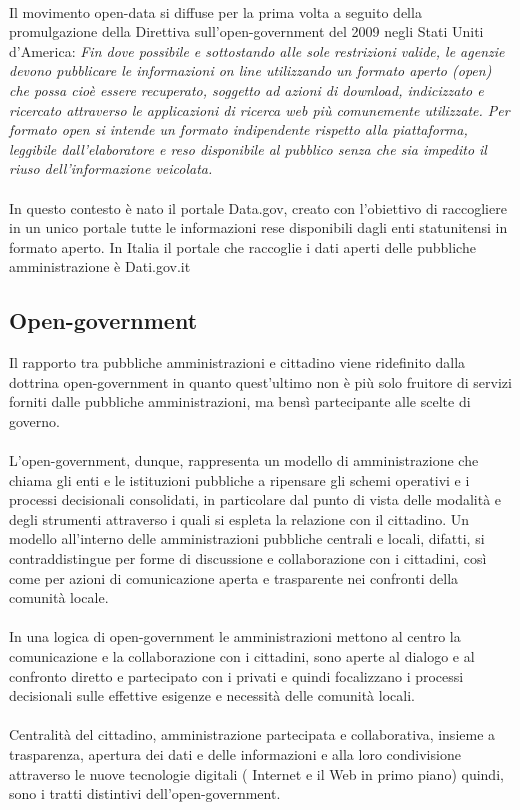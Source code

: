 \documentclass{article}
\theoremstyle{plain}
\theoremstyle{definition}
\begin{document}
\phantom
\\
Il movimento open-data si diffuse per la prima volta a seguito della promulgazione della Direttiva sull'open-government del 2009 negli Stati Uniti d'America:
\textit{Fin dove possibile e sottostando alle sole restrizioni valide, le agenzie devono pubblicare le informazioni on line utilizzando un formato aperto (open) che possa cioè essere recuperato, soggetto ad azioni di download, indicizzato e ricercato attraverso le applicazioni di ricerca web più comunemente utilizzate. Per formato open si intende un formato indipendente rispetto alla piattaforma, leggibile dall'elaboratore e reso disponibile al pubblico senza che sia impedito il riuso dell'informazione veicolata.}
\\
\\
In questo contesto è nato il portale Data.gov, creato con l'obiettivo di raccogliere in un unico portale tutte le informazioni rese disponibili dagli enti statunitensi in formato aperto. In Italia il portale che raccoglie i dati aperti delle pubbliche amministrazione è Dati.gov.it

\subsection{Open-government} 
Il rapporto tra pubbliche amministrazioni e cittadino viene ridefinito dalla dottrina open-government in quanto quest'ultimo non è più solo fruitore di servizi forniti dalle pubbliche amministrazioni, ma bensì partecipante alle scelte di governo.
\\
\\
L'open-government, dunque, rappresenta un modello di amministrazione che chiama gli enti e le istituzioni pubbliche a ripensare gli schemi operativi e i processi decisionali consolidati, in particolare dal punto di vista delle modalità e degli strumenti attraverso i quali si espleta la relazione con il cittadino. Un modello  all'interno delle amministrazioni pubbliche centrali e locali, difatti, si contraddistingue per forme di discussione e collaborazione con i cittadini, così come per azioni di comunicazione aperta e trasparente nei confronti della comunità locale. 
\\
\\
In una logica di open-government le amministrazioni mettono al centro la comunicazione e la collaborazione con i cittadini, sono aperte al dialogo e al confronto diretto e partecipato con i privati e quindi focalizzano i processi decisionali sulle effettive esigenze e necessità delle comunità locali. 
\\
\\
Centralità del cittadino, amministrazione partecipata e collaborativa, insieme a trasparenza, apertura dei dati e delle informazioni e alla loro condivisione attraverso le nuove tecnologie digitali ( Internet e il Web in primo piano) quindi, sono i tratti distintivi dell'open-government. 
 
\end{document}
